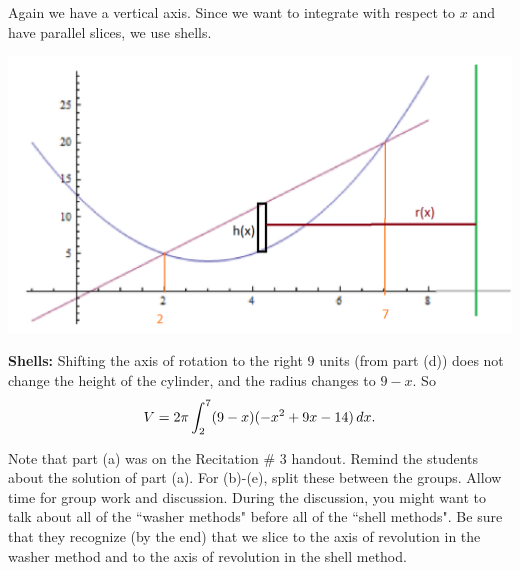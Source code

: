 \documentclass[handout]{ximera}
\begin{document}
\begin{problem}
\begin{enumerate}
\begin{freeResponse}
		
		
		Again we have a vertical axis.  Since we want to integrate with respect to $x$ and have parallel slices, we use shells.
		
		\begin{image}
		\includegraphics[scale=0.6]{Figure6-4-15.png}
		\end{image}
		
		{\bf Shells: }
		Shifting the axis of rotation to the right 9 units (from part (d)) does not change the height of the cylinder, and the radius changes to $9-x$.
		So
			\[
			V = 2 \pi \int_2^7 (9-x) (-x^2 + 9x - 14) \,d x.
			\]
			
		
		

		\end{freeResponse}
		
	\end{enumerate}
	
\end{problem}

\begin{instructorNotes}
Note that part (a) was on the Recitation \# 3 handout. Remind the students about the solution of part (a). 
For (b)-(e), split these between the groups. Allow time for group work and discussion.   
During the discussion, you might want to talk about all of the ``washer methods" before all of the ``shell methods".  
Be sure that they recognize (by the end) that we slice  to the axis of revolution in the washer method and  to the axis of revolution in the shell method.
\end{instructorNotes}


















	
	
	
	
	
	
	
	
	

	










								
				
				
	
\end{document}
